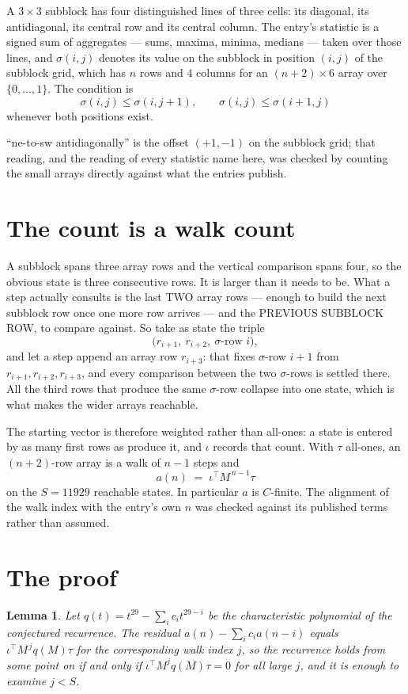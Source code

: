 \documentclass[11pt,a4paper]{article}
\theoremstyle{plain}
\newtheorem{lemma}[theorem]{Lemma}
\theoremstyle{definition}
\begin{document}
A $3\times3$ subblock has four distinguished lines of three cells: its diagonal, its
antidiagonal, its central row and its central column. The entry's statistic is a signed sum of
aggregates --- sums, maxima, minima, medians --- taken over those lines, and $\sigma(i,j)$
denotes its value on the subblock in position $(i,j)$ of the subblock grid, which has $n$ rows
and $4$ columns for an $(n+2)\times6$ array over $\{0,\dots,1\}$. The condition is
\[
\sigma(i,j)\le\sigma(i,j+1),\qquad \sigma(i,j)\le\sigma(i+1,j)
\]
whenever both positions exist.

``ne-to-sw antidiagonally'' is the offset $(+1,-1)$ on the subblock grid; that reading, and
the reading of every statistic name here, was checked by counting the small arrays directly
against what the entries publish.

\section{The count is a walk count}

A subblock spans three array rows and the vertical comparison spans four, so the obvious state
is three consecutive rows. It is larger than it needs to be. What a step actually consults is
the last TWO array rows --- enough to build the next subblock row once one more row arrives ---
and the PREVIOUS SUBBLOCK ROW, to compare against. So take as state the triple
\[
\bigl(r_{i+1},\ r_{i+2},\ \sigma\text{-row }i\bigr),
\]
and let a step append an array row $r_{i+3}$: that fixes $\sigma$-row $i+1$ from
$r_{i+1},r_{i+2},r_{i+3}$, and every comparison between the two $\sigma$-rows is settled
there. All the third rows that produce the same $\sigma$-row collapse into one state, which is
what makes the wider arrays reachable.

The starting vector is therefore weighted rather than all-ones: a state is entered by as many
first rows as produce it, and $\iota$ records that count. With $\tau$ all-ones, an
$(n+2)$-row array is a walk of $n-1$ steps and
\[
a(n)\;=\;\iota^{\!\top}M^{\,n-1}\tau
\]
on the $S=11929$ reachable states. In particular $a$ is $C$-finite. The alignment of the walk
index with the entry's own $n$ was checked against its published terms rather than assumed.

\section{The proof}

\begin{lemma}\label{lem:crit}
Let $q(t)=t^{29}-\sum_i c_it^{29-i}$ be the characteristic polynomial of the
conjectured recurrence. The residual $a(n)-\sum_ic_ia(n-i)$ equals
$\iota^{\!\top}M^{\,j}q(M)\tau$ for the corresponding walk index $j$, so the recurrence
holds from some point on if and only if $\iota^{\!\top}M^{j}q(M)\tau=0$ for all large $j$,
and it is enough to examine $j<S$.
\end{lemma}
\end{document}
